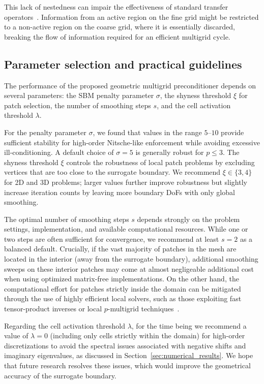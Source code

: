 \documentclass{elsarticle}
\begin{document}
This lack of nestedness can impair the effectiveness of standard transfer operators~\cite{wichrowski2025geometric}.
Information from an active region on the fine grid might be restricted to a non-active region on the coarse grid, where
it is essentially discarded, breaking the flow of information required for an efficient multigrid cycle.

\subsection{Parameter selection and practical guidelines}
\label{sec:parameter_selection}
The performance of the proposed geometric multigrid preconditioner depends on several parameters: the SBM penalty parameter $\sigma$, the shyness threshold $\xi$ for patch selection, the number of smoothing steps $s$, and the cell activation threshold $\lambda$.

For the penalty parameter $\sigma$, we found that values in the range $5$--$10$ provide sufficient stability for
high-order Nitsche-like enforcement while avoiding excessive ill-conditioning. A default choice of $\sigma=5$ is
generally robust for $p \le 3$. The shyness threshold $\xi$ controls the robustness of local patch problems by
excluding vertices that are too close to the surrogate boundary. We recommend $\xi \in \{3, 4\}$ for 2D and 3D
problems; larger values further improve robustness but slightly increase iteration counts by leaving more boundary DoFs
with only global smoothing.

The optimal number of smoothing steps $s$ depends strongly on the problem settings, implementation, and available
computational resources. While one or two steps are often sufficient for convergence, we recommend at least $s=2$ as a
balanced default. Crucially, if the vast majority of patches in the mesh are located in the interior (away from the
surrogate boundary), additional smoothing sweeps on these interior patches may come at almost negligeable additional
cost when using optimized matrix-free implementations. On the other hand, the computational effort for patches strictly
inside the domain can be mitigated through the use of highly efficient local solvers, such as those exploiting fast
tensor-product inverses or local $p$-multigrid techniques~\cite{wichrowski2025smoothers, wichrowski2025local,
    wichrowski2026towards}.

Regarding the cell activation threshold $\lambda$, for the time being we recommend a value of $\lambda=0$ (including
only cells strictly within the domain) for high-order discretizations to avoid the spectral issues associated with
negative shifts and imaginary eigenvalues, as discussed in Section~\ref{sec:numerical_results}. We hope that future
research resolves these issues, which would improve the geometrical accuracy of the surrogate boundary.
\end{document}

